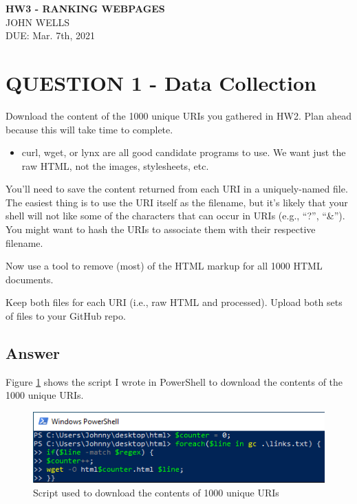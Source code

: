 \documentclass[12pt]{article}
\begin{document}
\begin{centering}
{\large\textbf{HW3 - RANKING WEBPAGES}}\\ 
JOHN WELLS\\
DUE: Mar. 7th, 2021\\
\end{centering}

\section*{QUESTION 1 - Data Collection}
Download the content of the 1000 unique URIs you gathered in HW2. Plan ahead because this will take time to complete.

\begin{itemize}
    \item curl, wget, or lynx are all good candidate programs to use. We want just the raw HTML, not the images, stylesheets, etc.
\end{itemize}

You'll need to save the content returned from each URI in a uniquely-named file. The easiest thing is to use the URI itself as the filename, but it's likely that your shell will not like some of the characters that can occur in URIs (e.g., ``?'', ``\&''). You might want to hash the URIs to associate them with their respective filename.

Now use a tool to remove (most) of the HTML markup for all 1000 HTML documents.

Keep both files for each URI (i.e., raw HTML and processed). Upload both sets of files to your GitHub repo.

\subsection*{Answer}

Figure \ref{fig:ps-script} shows the script I wrote in PowerShell to download the contents of the 1000 unique URIs.

\begin{figure}[h]
    \centering
    \includegraphics[trim=0 0 0 0, clip, width=\textwidth] {ps-script.png}
    \caption{Script used to download the contents of 1000 unique URIs}
    \label{fig:ps-script}
\end{figure}
\end{document}

